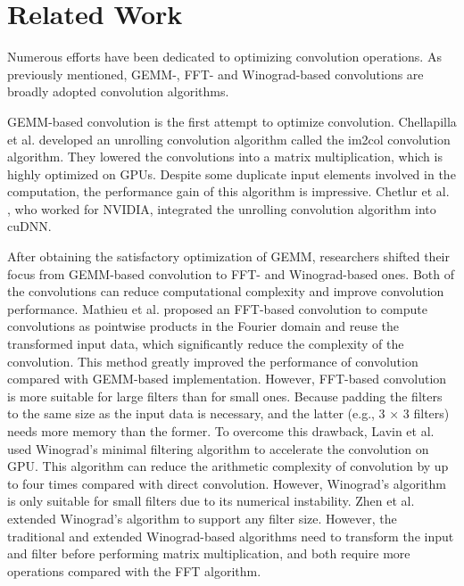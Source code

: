 \section{Related Work}
Numerous efforts have been dedicated to optimizing convolution operations. As previously mentioned, GEMM-, FFT- and
Winograd-based convolutions are broadly adopted convolution algorithms.

GEMM-based convolution is the first attempt to optimize convolution. Chellapilla et al. \cite{Chellapilla2006High} developed an unrolling
convolution algorithm  called the im2col convolution algorithm. They lowered the convolutions into a matrix multiplication, which is
highly optimized on GPUs. Despite some duplicate input elements involved in the computation, the performance gain of this algorithm is impressive. Chetlur et al. \cite{ChetlurWVCTCS14}, who worked for NVIDIA, integrated the unrolling convolution algorithm into cuDNN.

After obtaining the satisfactory optimization of GEMM, researchers shifted their focus from GEMM-based convolution to FFT- and
Winograd-based ones. Both of the convolutions can reduce computational complexity and improve convolution performance. Mathieu et al.
\cite{mathieu2013fast} proposed an FFT-based convolution to compute convolutions as pointwise products in the Fourier domain and reuse the
transformed input data, which significantly reduce the complexity of the convolution. This method greatly improved the
performance of convolution compared with GEMM-based implementation. However, FFT-based convolution is more suitable for large filters than
for small ones. Because padding the filters to the same size as the input data is necessary, and  the latter (e.g., 3 × 3 filters) needs
more memory than the former. To overcome this drawback, Lavin et al. \cite{lavin2016fast} used Winograd's minimal filtering algorithm to
accelerate the convolution on GPU. This algorithm can reduce the arithmetic complexity of convolution by up to four times compared with
direct convolution. However, Winograd's algorithm is only suitable for small filters due to its numerical instability.
Zhen et al. \cite{Zhen2018Optimizing} extended Winograd's algorithm to support any filter size. However, the traditional and extended Winograd-based
algorithms need to transform the input and filter before performing matrix multiplication, and both require more operations compared with
the FFT algorithm.

